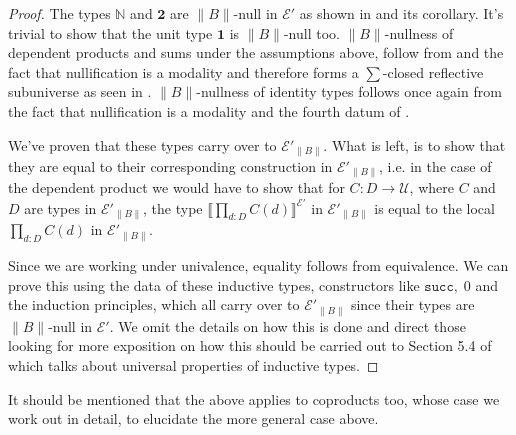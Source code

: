 \documentclass[12pt]{report}
\theoremstyle{definition}
\begin{document}
\begin{proof}
The types $\mathbb{N}$ and $\mathbf{2}$ are $\lVert B \rVert$-null in $\mathcal{E}'$ as shown in  and its corollary. 
It's trivial to show that the unit type $\mathbf{1}$ is $\lVert B \rVert$-null too. 
$\lVert B \rVert$-nullness of dependent products and sums under the assumptions above, follow from  and the fact that nullification is a modality and therefore forms a $\sum$-closed reflective subuniverse as seen in . 
$\lVert B \rVert$-nullness of identity types follows once again from the fact that nullification is a modality and the fourth datum of . 

We've proven that these types carry over to $\mathcal{E}'_{\lVert B \rVert}$. 
What is left, is to show that they are equal to their corresponding construction in $\mathcal{E}'_{\lVert B \rVert}$, i.e. in the case of the dependent product we would have to show that for $C : D \rightarrow \mathcal{U}$, where $C$ and $D$ are types in $\mathcal{E}'_{\lVert B \rVert}$, the type $\llbracket \prod_{d:D}C(d) \rrbracket^{\mathcal{E}'}$ in $\mathcal{E}'_{\lVert B \rVert}$ is equal to the local $\prod_{d:D}C(d)$ in $\mathcal{E}'_{\lVert B \rVert}$. 

Since we are working under univalence, equality follows from equivalence. 
We can prove this using the data of these inductive types, constructors like $\mathtt{succ},\;0$ and the induction principles, which all carry over to $\mathcal{E}'_{\lVert B \rVert}$ since their types are $\lVert B \rVert$-null in $\mathcal{E}'$. 
We omit the details on how this is done and direct those looking for more exposition on how this should be carried out to Section 5.4 of \cite{hottbook} which talks about universal properties of inductive types. 
\end{proof}
It should be mentioned that the above applies to coproducts too, whose case we work out in detail, to elucidate the more general case above. 
\end{document}

